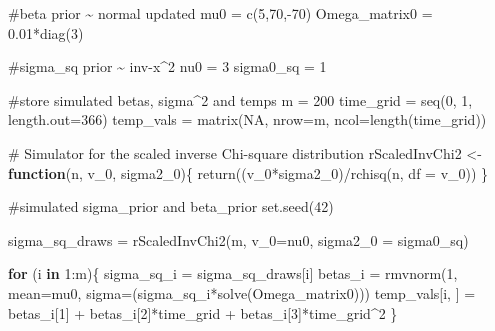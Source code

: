 \documentclass[
  letterpaper,
  DIV=11,
  numbers=noendperiod]{scrartcl}
\newenvironment{Shaded}{\begin{snugshade}}{\end{snugshade}}
\newcommand{\AttributeTok}[1]{\textcolor[rgb]{0.40,0.45,0.13}{#1}}
\newcommand{\CommentTok}[1]{\textcolor[rgb]{0.37,0.37,0.37}{#1}}
\newcommand{\ConstantTok}[1]{\textcolor[rgb]{0.56,0.35,0.01}{#1}}
\newcommand{\ControlFlowTok}[1]{\textcolor[rgb]{0.00,0.23,0.31}{\textbf{#1}}}
\newcommand{\DecValTok}[1]{\textcolor[rgb]{0.68,0.00,0.00}{#1}}
\newcommand{\FloatTok}[1]{\textcolor[rgb]{0.68,0.00,0.00}{#1}}
\newcommand{\FunctionTok}[1]{\textcolor[rgb]{0.28,0.35,0.67}{#1}}
\newcommand{\NormalTok}[1]{\textcolor[rgb]{0.00,0.23,0.31}{#1}}
\newcommand{\OtherTok}[1]{\textcolor[rgb]{0.00,0.23,0.31}{#1}}
\newcommand{\SpecialCharTok}[1]{\textcolor[rgb]{0.37,0.37,0.37}{#1}}
\begin{document}
\begin{Shaded}
\begin{Highlighting}[]
\CommentTok{\#beta prior \textasciitilde{} normal updated}
\NormalTok{mu0 }\OtherTok{=} \FunctionTok{c}\NormalTok{(}\DecValTok{5}\NormalTok{,}\DecValTok{70}\NormalTok{,}\SpecialCharTok{{-}}\DecValTok{70}\NormalTok{)}
\NormalTok{Omega\_matrix0 }\OtherTok{=} \FloatTok{0.01}\SpecialCharTok{*}\FunctionTok{diag}\NormalTok{(}\DecValTok{3}\NormalTok{)}

\CommentTok{\#sigma\_sq prior \textasciitilde{} inv{-}x\^{}2 }
\NormalTok{nu0 }\OtherTok{=} \DecValTok{3}
\NormalTok{sigma0\_sq }\OtherTok{=} \DecValTok{1}

\CommentTok{\#store simulated betas, sigma\^{}2 and temps}
\NormalTok{m }\OtherTok{=} \DecValTok{200}
\NormalTok{time\_grid }\OtherTok{=} \FunctionTok{seq}\NormalTok{(}\DecValTok{0}\NormalTok{, }\DecValTok{1}\NormalTok{, }\AttributeTok{length.out=}\DecValTok{366}\NormalTok{)}
\NormalTok{temp\_vals }\OtherTok{=} \FunctionTok{matrix}\NormalTok{(}\ConstantTok{NA}\NormalTok{, }\AttributeTok{nrow=}\NormalTok{m, }\AttributeTok{ncol=}\FunctionTok{length}\NormalTok{(time\_grid))}

\CommentTok{\# Simulator for the scaled inverse Chi{-}square distribution}
\NormalTok{rScaledInvChi2 }\OtherTok{\textless{}{-}} \ControlFlowTok{function}\NormalTok{(n, v\_0, sigma2\_0)\{}
  \FunctionTok{return}\NormalTok{((v\_0}\SpecialCharTok{*}\NormalTok{sigma2\_0)}\SpecialCharTok{/}\FunctionTok{rchisq}\NormalTok{(n, }\AttributeTok{df =}\NormalTok{ v\_0))}
\NormalTok{\}}

\CommentTok{\#simulated sigma\_prior and beta\_prior}
\FunctionTok{set.seed}\NormalTok{(}\DecValTok{42}\NormalTok{)}

\NormalTok{sigma\_sq\_draws }\OtherTok{=} \FunctionTok{rScaledInvChi2}\NormalTok{(m, }\AttributeTok{v\_0=}\NormalTok{nu0, }\AttributeTok{sigma2\_0 =}\NormalTok{ sigma0\_sq)}

\ControlFlowTok{for}\NormalTok{ (i }\ControlFlowTok{in} \DecValTok{1}\SpecialCharTok{:}\NormalTok{m)\{}
\NormalTok{  sigma\_sq\_i }\OtherTok{=}\NormalTok{ sigma\_sq\_draws[i]}
\NormalTok{  betas\_i }\OtherTok{=} \FunctionTok{rmvnorm}\NormalTok{(}\DecValTok{1}\NormalTok{, }\AttributeTok{mean=}\NormalTok{mu0, }\AttributeTok{sigma=}\NormalTok{(sigma\_sq\_i}\SpecialCharTok{*}\FunctionTok{solve}\NormalTok{(Omega\_matrix0)))}
\NormalTok{  temp\_vals[i, ] }\OtherTok{=}\NormalTok{ betas\_i[}\DecValTok{1}\NormalTok{] }\SpecialCharTok{+}\NormalTok{ betas\_i[}\DecValTok{2}\NormalTok{]}\SpecialCharTok{*}\NormalTok{time\_grid }\SpecialCharTok{+}\NormalTok{ betas\_i[}\DecValTok{3}\NormalTok{]}\SpecialCharTok{*}\NormalTok{time\_grid}\SpecialCharTok{\^{}}\DecValTok{2}
\NormalTok{\}}


\end{Highlighting}
\end{Shaded}
\end{document}
